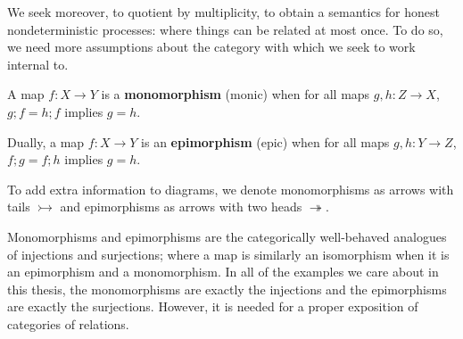 We seek moreover, to quotient by multiplicity, to obtain a semantics for honest nondeterministic processes: where things can be related at most once.  To do so, we need more assumptions about the category with which we seek to work internal to.
\begin{definition}
\label{def:mono}
A map $f:X\to Y$ is a {\bf monomorphism} (monic) when for all maps $g,h:Z\to X$, $g;f=h;f$ implies $ g=h$.

Dually, a map $f:X\to Y$ is an {\bf epimorphism} (epic) when for all maps $g,h:Y\to Z$, $f;g=f;h$ implies $ g=h$.

To add extra information to diagrams, we denote monomorphisms as arrows with tails $\rightarrowtail$ and epimorphisms as arrows with two heads $\twoheadrightarrow$.  
\end{definition}
Monomorphisms and epimorphisms are the categorically well-behaved analogues of injections and surjections; where a map is similarly an isomorphism when it is an epimorphism and a monomorphism.  In all of the examples we care about in this thesis, the monomorphisms are exactly the injections and the epimorphisms are exactly the surjections.  However, it is needed for a proper exposition of categories of relations.

